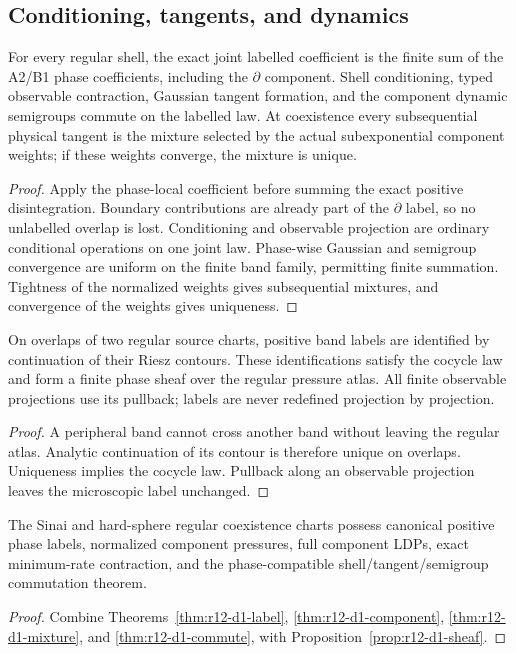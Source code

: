 \subsection{Conditioning, tangents, and dynamics}

\begin{theorem}
\label{thm:r12-d1-commute}
For every regular shell, the exact joint labelled coefficient is the finite sum
of the A2/B1 phase coefficients, including the $\partial$ component.  Shell
conditioning, typed observable contraction, Gaussian tangent formation, and
the component dynamic semigroups commute on the labelled law.  At coexistence
every subsequential physical tangent is the mixture selected by the actual
subexponential component weights; if these weights converge, the mixture is
unique.
\end{theorem}

\begin{proof}
Apply the phase-local coefficient before summing the exact positive
disintegration.  Boundary contributions are already part of the
$\partial$ label, so no unlabelled overlap is lost.  Conditioning and
observable projection are ordinary conditional operations on one joint law.
Phase-wise Gaussian and semigroup convergence are uniform on the finite band
family, permitting finite summation.  Tightness of the normalized weights
gives subsequential mixtures, and convergence of the weights gives uniqueness.
\end{proof}

\begin{proposition}
\label{prop:r12-d1-sheaf}
On overlaps of two regular source charts, positive band labels are identified
by continuation of their Riesz contours.  These identifications satisfy the
cocycle law and form a finite phase sheaf over the regular pressure atlas.
All finite observable projections use its pullback; labels are never redefined
projection by projection.
\end{proposition}

\begin{proof}
A peripheral band cannot cross another band without leaving the regular atlas.
Analytic continuation of its contour is therefore unique on overlaps.  Uniqueness
implies the cocycle law.  Pullback along an observable projection leaves the
microscopic label unchanged.
\end{proof}

\begin{theorem}
\label{thm:r12-d1-main}
The Sinai and hard-sphere regular coexistence charts possess canonical positive
phase labels, normalized component pressures, full component LDPs, exact
minimum-rate contraction, and the phase-compatible shell/tangent/semigroup
commutation theorem.
\end{theorem}

\begin{proof}
Combine Theorems~\ref{thm:r12-d1-label},
\ref{thm:r12-d1-component}, \ref{thm:r12-d1-mixture}, and
\ref{thm:r12-d1-commute}, with Proposition~\ref{prop:r12-d1-sheaf}.
\end{proof}
